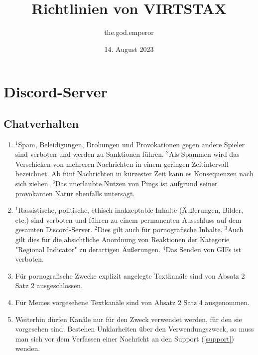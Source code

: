 \documentclass{article}
\title{Richtlinien von VIRTSTAX}
\author{the.god.emperor}
\date{14. August 2023}
\begin{document}
\maketitle
\newpage
\tableofcontents
\newpage
\section{Discord-Server}
\subsection{Chatverhalten}\label{verhalten}
\begin{enumerate}[(1)]
	\item $^{1}$Spam, Beleidigungen, Drohungen und Provokationen gegen andere Spieler sind verboten und werden zu Sanktionen führen. $^{2}$Als Spammen wird das Verschicken von mehreren Nachrichten in einem geringen Zeitintervall bezeichnet. Ab fünf Nachrichten in kürzester Zeit kann es Konsequenzen nach sich ziehen. $^{3}$Das unerlaubte Nutzen von Pings ist aufgrund seiner provokanten Natur ebenfalls untersagt.
	\item $^{1}$Rassistische, politische, ethisch inakzeptable Inhalte (Äußerungen, Bilder, etc.) sind verboten und führen zu einem permanenten Ausschluss auf dem gesamten Discord-Server. $^{2}$Dies gilt auch für pornografische Inhalte. $^{3}$Auch gilt dies für die absichtliche Anordnung von Reaktionen der Kategorie "Regional Indicator" zu derartigen Äußerungen. $^{4}$Das Senden von GIFs ist verboten.
	\item Für pornografische Zwecke explizit angelegte Textkanäle sind von Absatz 2 Satz 2 ausgeschlossen.
	\item Für Memes vorgesehene Textkanäle sind von Absatz 2 Satz 4 ausgenommen.
	\item Weiterhin dürfen Kanäle nur für den Zweck verwendet werden, für den sie vorgesehen sind. Bestehen Unklarheiten über den Verwendungszweck, so muss man sich vor dem Verfassen einer Nachricht an den Support (\ref{support}) wenden.
\end{enumerate}
\end{document}
